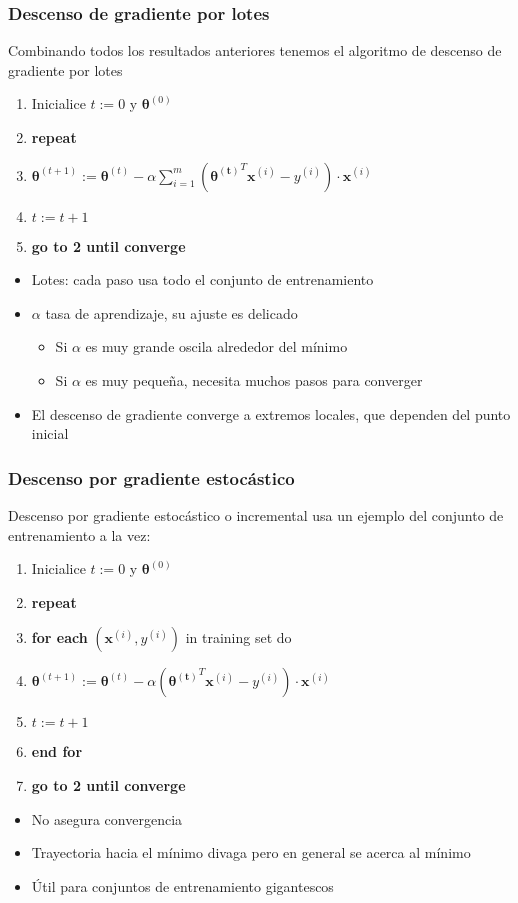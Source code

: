 \documentclass[spanish]{beamer}
\begin{document}
\begin{frame}
\frametitle{Descenso de gradiente por lotes}  
Combinando todos los resultados anteriores tenemos el algoritmo de descenso de gradiente por lotes 
\begin{enumerate}
\item Inicialice $t:=0$ y $\boldsymbol{\theta}^{(0)}$  
\item \textbf{repeat}
\item $\boldsymbol{\theta}^{(t+1)}:= \boldsymbol{\theta}^{(t)} - \alpha    \sum_{i=1}^{m} ( \boldsymbol{\theta^{(t)}}^T \boldsymbol{x}^{(i)}-y^{(i)}) \cdot  \boldsymbol{x}^{(i)}$
\item $t:=t+1$
\item \textbf{go to 2 until converge}
\end{enumerate}
\begin{itemize}
\item Lotes: cada paso usa todo el conjunto de entrenamiento 
\item $\alpha$ tasa de aprendizaje, su ajuste es delicado 
\begin{itemize}
\item Si $\alpha$ es muy grande oscila alrededor del  mínimo
\item Si $\alpha$ es muy pequeña, necesita muchos pasos para converger 
\end{itemize} 
\item El descenso de gradiente converge a extremos locales, que dependen del punto inicial 
\end{itemize}

\end{frame}
\begin{frame}
\frametitle{Descenso por gradiente estocástico}  
Descenso por gradiente estocástico  o incremental usa un ejemplo del conjunto de entrenamiento a la vez:
 
\begin{enumerate}
\item Inicialice $t:=0$ y $\boldsymbol{\theta}^{(0)}$  
\item \textbf{repeat}
\item \textbf{for each} $(\boldsymbol{x}^{(i)},y^{(i)})$ in training set do
\item $\boldsymbol{\theta}^{(t+1)}:= \boldsymbol{\theta}^{(t)} - \alpha ( \boldsymbol{\theta^{(t)}}^T \boldsymbol{x}^{(i)}-y^{(i)}) \cdot  \boldsymbol{x}^{(i)}$
\item $t:=t+1$
\item \textbf{end for}
\item \textbf{go to 2 until converge}
\end{enumerate}
\begin{itemize}
\item No asegura convergencia
\item Trayectoria hacia el mínimo divaga pero en general se acerca al mínimo
\item Útil para conjuntos de entrenamiento gigantescos 
\end{itemize}

\end{frame}
\end{document}
